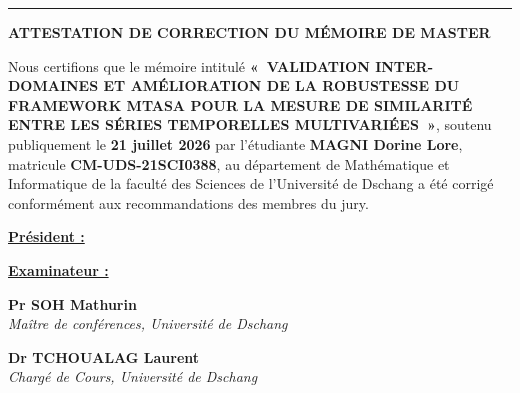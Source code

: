 \vspace{0.5em}
\noindent\rule{\linewidth}{0.6pt}

\vspace{2em}

{\bfseries\fontsize{14pt}{18pt}\selectfont ATTESTATION DE CORRECTION DU MÉMOIRE DE MASTER \par}

\vspace{1.5em}

\begin{SingleSpace}
\begin{flushleft}
\setlength{\parindent}{0.6cm}

\hspace{0.6cm}Nous certifions que le mémoire intitulé \textbf{«~VALIDATION INTER-DOMAINES ET AMÉLIORATION DE LA ROBUSTESSE DU FRAMEWORK MTASA POUR LA MESURE DE SIMILARITÉ ENTRE LES SÉRIES TEMPORELLES MULTIVARIÉES~»}, soutenu publiquement le \textbf{21 juillet 2026} par l'étudiante \textbf{MAGNI Dorine Lore}, matricule \textbf{CM-UDS-21SCI0388}, au département de Mathématique et Informatique de la faculté des Sciences de l'Université de Dschang a été corrigé conformément aux recommandations des membres du jury.

\end{flushleft}
\end{SingleSpace}

\vspace{1.5em}

\noindent
\begin{minipage}[t]{0.47\linewidth}
\raggedright \underline{\textbf{Président :}}
\end{minipage}%
\hfill
\begin{minipage}[t]{0.47\linewidth}
\raggedright \underline{\textbf{Examinateur :}}
\end{minipage}

\vspace{5.5em}

\noindent
\begin{minipage}[t]{0.47\linewidth}
\raggedright \textbf{Pr SOH Mathurin}\\[0.15em]
{\itshape\small Maître de conférences, Université de Dschang}
\end{minipage}%
\hfill
\begin{minipage}[t]{0.47\linewidth}
\raggedright \textbf{Dr TCHOUALAG Laurent}\\[0.15em]
{\itshape\small Chargé de Cours, Université de Dschang}
\end{minipage}

